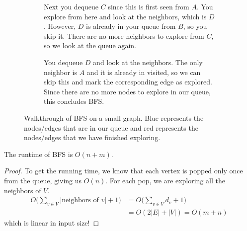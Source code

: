 \begin{example}
\begin{figure}[H]
\begin{subfigure}[b]{0.48\textwidth}
    \caption{Next you dequeue $C$ since this is first seen from $A$. You explore from here and look at the neighbors, which is $D$. However, $D$ is already in your queue from $B$, so you skip it. There are no more neighbors to explore from $C$, so we look at the queue again.}
  \end{subfigure}
  \hfill 
  \begin{subfigure}[b]{0.48\textwidth}
    \centering
    \caption{You dequeue $D$ and look at the neighbors. The only neighbor is $A$ and it is already in visited, so we can skip this and mark the corresponding edge as explored. Since there are no more nodes to explore in our queue, this concludes BFS.}
  \end{subfigure}
  \caption{Walkthrough of BFS on a small graph. Blue represents the nodes/edges that are in our queue and red represents the nodes/edges that we have finished exploring.}
  \label{fig:bfs_example}
\end{figure}
  \end{example}


  \begin{theorem}
    The runtime of BFS is $O(n+m)$. 
  \end{theorem}
  \begin{proof}
    To get the running time, we know that each vertex is popped only once from the queue, giving us $O(n)$. For each pop, we are exploring all the neighbors of $V$. 
    \begin{align}
      O \bigg( \sum_{v \in V} | \text{neighbors of } v| + 1\bigg) & = O \bigg( \sum_{v \in V} d_v + 1 \bigg) \\
                                           & = O (2 |E| + |V|) = O(m + n )
    \end{align}
    which is linear in input size!  
  \end{proof}

